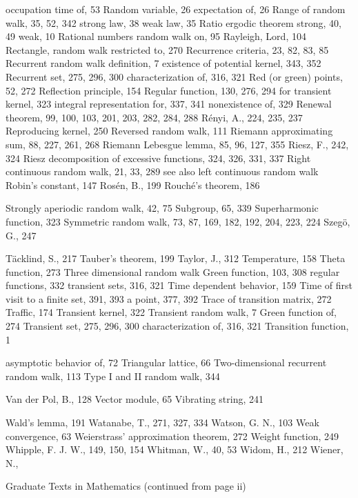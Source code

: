 occupation time of, 53
Random variable, 26
expectation of, 26
Range of random walk, 35, 52, 342
strong law, 38
weak law, 35
Ratio ergodic theorem
strong, 40, 49
weak, 10
Rational numbers
random walk on, 95
Rayleigh, Lord, 104
Rectangle,
random walk restricted to, 270
Recurrence criteria, 23, 82, 83, 85
Recurrent random walk
definition, 7
existence of potential kernel, 343, 352
Recurrent set, 275, 296, 300
characterization of, 316, 321
Red (or green) points, 52, 272
Reflection principle, 154
Regular function, 130, 276, 294
for transient kernel, 323
integral representation for, 337, 341
nonexistence of, 329
Renewal theorem, 99, 100, 103, 201, 203, 282, 284, 288
Rényi, A., 224, 235, 237
Reproducing kernel, 250
Reversed random walk, 111
Riemann approximating sum, 88, 227, 261, 268
Riemann Lebesgue lemma, 85, 96, 127, 355
Riesz, F., 242, 324
Riesz decomposition
of excessive functions, 324, 326, 331, 337
Right continuous random walk, 21, 33, 289
see also left continuous random walk
Robin's constant, 147
Rosén, B., 199
Rouché's theorem, 186

Strongly aperiodic random walk, 42, 75
Subgroup, 65, 339
Superharmonic function, 323
Symmetric random walk, 73, 87, 169, 182, 192, 204, 223, 224
Szegö, G., 247

Täcklind, S., 217
Tauber’s theorem, 199
Taylor, J., 312
Temperature, 158
Theta function, 273
Three dimensional random walk
Green function, 103, 308
regular functions, 332
transient sets, 316, 321
Time dependent behavior, 159
Time of first visit to a finite set, 391, 393
a point, 377, 392
Trace of transition matrix, 272
Traffic, 174
Transient kernel, 322
Transient random walk, 7
Green function of, 274
Transient set, 275, 296, 300
characterization of, 316, 321
Transition function, 1

asymptotic behavior of, 72
Triangular lattice, 66
Two-dimensional recurrent random walk, 113
Type I and II random walk, 344

Van der Pol, B., 128
Vector module, 65
Vibrating string, 241

Wald’s lemma, 191
Watanabe, T., 271, 327, 334
Watson, G. N., 103
Weak convergence, 63
Weierstrass’ approximation theorem, 272
Weight function, 249
Whipple, F. J. W., 149, 150, 154
Whitman, W., 40, 53
Widom, H., 212
Wiener, N.,

Graduate Texts in Mathematics
(continued from page ii)

